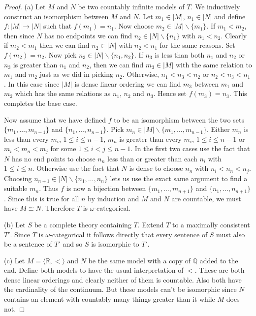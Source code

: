 \documentclass{article}
\begin{document}
\begin{proof}
(a) Let $M$ and $N$ be two countably infinite models of $T$. We inductively construct an isomorphism between $M$ and $N$. Let $m_1 \in |M|$, $n_1 \in |N|$ and define $f : |M| \to |N|$ such that $f(m_1) = n_1$. Now choose $m_2 \in |M| \backslash \{m_1\}$. If $m_1 < m_2$, then since $N$ has no endpoints we can find $n_2 \in |N| \backslash \{n_1\}$ with $n_1 < n_2$. Clearly if $m_2 < m_1$ then we can find $n_2 \in |N|$ with $n_2 < n_1$ for the same reasons. Set $f(m_2) = n_2$. Now pick $n_3 \in |N| \backslash \{n_1, n_2\}$. If $n_3$ is less than both $n_1$ and $n_2$ or $n_3$ is greater than $n_1$ and $n_2$, then we can find $m_3 \in |M|$ with the same relation to $m_1$ and $m_2$ just as we did in picking $n_2$. Otherwise, $n_1 < n_3 < n_2$ or $n_2 < n_3 < n_1$. In this case since $|M|$ is dense linear ordering we can find $m_3$ between $m_1$ and $m_2$ which has the same relations as $n_1$, $n_2$ and $n_3$. Hence set $f(m_3) = n_3$. This completes the base case.

Now assume that we have defined $f$ to be an isomorphism between the two sets $\{m_1, \dots , m_{n-1}\}$ and $\{n_1, \dots , n_{n-1}\}$. Pick $m_n \in |M| \backslash \{m_1, \dots , m_{n-1}\}$. Either $m_n$ is less than every $m_i$, $1 \leq i \leq n-1$, $m_n$ is greater than every $m_i$, $1 \leq i \leq n-1$ or $m_i < m_n < m_j$ for some $1 \leq i < j \leq n-1$. In the first two cases use the fact that $N$ has no end points to choose $n_n$ less than or greater than each $n_i$ with $1 \leq i \leq n$. Otherwise use the fact that $N$ is dense to choose $n_n$ with $n_i < n_n < n_j$. Choosing $n_{n+1} \in |N| \backslash \{n_1, \dots , n_n\}$ lets us use the exact same argument to find a suitable $m_n$. Thus $f$ is now a bijection between $\{m_1, \dots , m_{n+1}\}$ and $\{n_1, \dots , n_{n+1}\}$. Since this is true for all $n$ by induction and $M$ and $N$ are countable, we must have $M \cong N$. Therefore $T$ is $\omega$-categorical.

(b) Let $S$ be a complete theory containing $T$. Extend $T$ to a maximally consistent $T'$. Since $T$ is $\omega$-categorical it follows directly that every sentence of $S$ must also be a sentence of $T'$ and so $S$ is isomorphic to $T'$.

(c) Let $M = \langle \mathbb{R}, < \rangle$ and $N$ be the same model with a copy of $\mathbb{Q}$ added to the end. Define both models to have the usual interpretation of $<$. These are both dense linear orderings and clearly neither of them is countable. Also both have the cardinality of the continuum. But these models can't be isomorphic since $N$ contains an element with countably many things greater than it while $M$ does not.
\end{proof}
\end{document}
